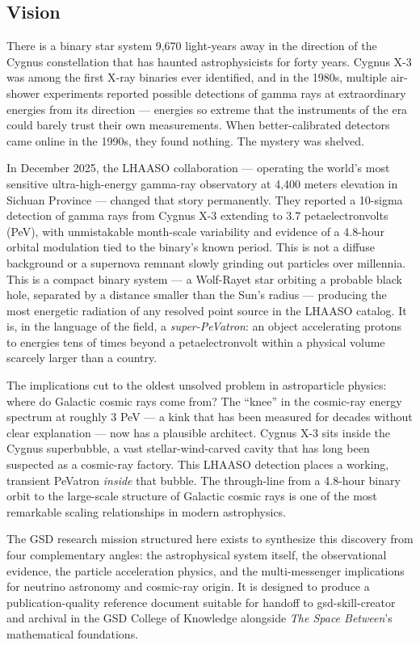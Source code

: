 \documentclass[11pt,letterpaper]{article}
\begin{document}
\subsection{Vision}

There is a binary star system 9,670 light-years away in the direction of the Cygnus constellation that has haunted astrophysicists for forty years. Cygnus X-3 was among the first X-ray binaries ever identified, and in the 1980s, multiple air-shower experiments reported possible detections of gamma rays at extraordinary energies from its direction --- energies so extreme that the instruments of the era could barely trust their own measurements. When better-calibrated detectors came online in the 1990s, they found nothing. The mystery was shelved.

In December 2025, the LHAASO collaboration --- operating the world's most sensitive ultra-high-energy gamma-ray observatory at 4,400 meters elevation in Sichuan Province --- changed that story permanently. They reported a 10-sigma detection of gamma rays from Cygnus X-3 extending to 3.7 petaelectronvolts (PeV), with unmistakable month-scale variability and evidence of a 4.8-hour orbital modulation tied to the binary's known period. This is not a diffuse background or a supernova remnant slowly grinding out particles over millennia. This is a compact binary system --- a Wolf-Rayet star orbiting a probable black hole, separated by a distance smaller than the Sun's radius --- producing the most energetic radiation of any resolved point source in the LHAASO catalog. It is, in the language of the field, a \emph{super-PeVatron}: an object accelerating protons to energies tens of times beyond a petaelectronvolt within a physical volume scarcely larger than a country.

The implications cut to the oldest unsolved problem in astroparticle physics: where do Galactic cosmic rays come from? The ``knee'' in the cosmic-ray energy spectrum at roughly 3 PeV --- a kink that has been measured for decades without clear explanation --- now has a plausible architect. Cygnus X-3 sits inside the Cygnus superbubble, a vast stellar-wind-carved cavity that has long been suspected as a cosmic-ray factory. This LHAASO detection places a working, transient PeVatron \emph{inside} that bubble. The through-line from a 4.8-hour binary orbit to the large-scale structure of Galactic cosmic rays is one of the most remarkable scaling relationships in modern astrophysics.

The GSD research mission structured here exists to synthesize this discovery from four complementary angles: the astrophysical system itself, the observational evidence, the particle acceleration physics, and the multi-messenger implications for neutrino astronomy and cosmic-ray origin. It is designed to produce a publication-quality reference document suitable for handoff to gsd-skill-creator and archival in the GSD College of Knowledge alongside \emph{The Space Between}'s mathematical foundations.
\end{document}
